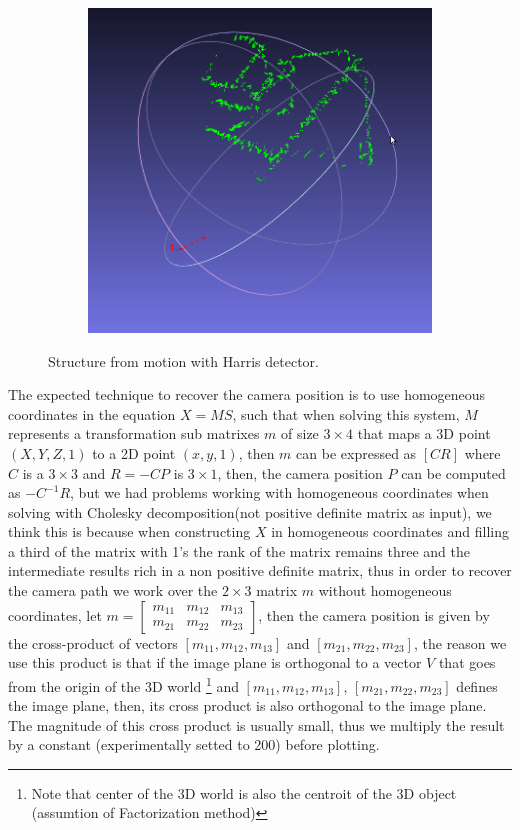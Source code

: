 \begin{figure}[H]
\begin{subfigure}{0.5\textwidth}
      \centering
      \includegraphics[width=0.9\linewidth]{figs/SFM3.png}
    \end{subfigure}
    \caption{Structure from motion with Harris detector.}
	\label{fig:sfm}
\end{figure}


The expected technique to recover the camera position is to use homogeneous coordinates in the equation $X = MS$, such that when solving this system, $M$ represents a transformation sub matrixes $m$ of size $3 \times 4$ that maps a 3D point $(X, Y, Z, 1)$ to a 2D point $(x, y, 1)$, then $m$ can be expressed as $[C R]$ where $C$ is a $3 \times 3$ and $R = -CP$ is $3 \times 1$, then, the camera position $P$ can be computed as $-C^{-1} R$, but we had problems working with homogeneous coordinates when solving with Cholesky decomposition(not positive definite matrix as input), we think this is because when constructing $X$ in homogeneous coordinates and filling a third of the matrix with 1's the rank of the matrix remains three and the intermediate results rich in a non positive definite matrix, thus in order to recover the camera path we work over the $2\times 3$ matrix $m$ without homogeneous coordinates, let $m = \begin{bmatrix}
    m_{11} & m_{12} & m_{13} \\
    m_{21} & m_{22} & m_{23} 
\end{bmatrix}
$, then the camera position is given by the cross-product of vectors $[m_{11}, m_{12}, m_{13}]$ and  $[m_{21}, m_{22}, m_{23}]$, the reason we use this product is that if the image plane is orthogonal to a vector $V$ that goes from the origin of the 3D world \footnote{Note that center of the 3D world is also the centroit of the 3D object (assumtion of Factorization method)} and  $[m_{11}, m_{12}, m_{13}]$, $[m_{21}, m_{22}, m_{23}]$ defines the image plane, then, its cross product is also orthogonal to the image plane. The magnitude of this cross product is usually small, thus we multiply the result by a constant (experimentally setted to 200) before plotting.




